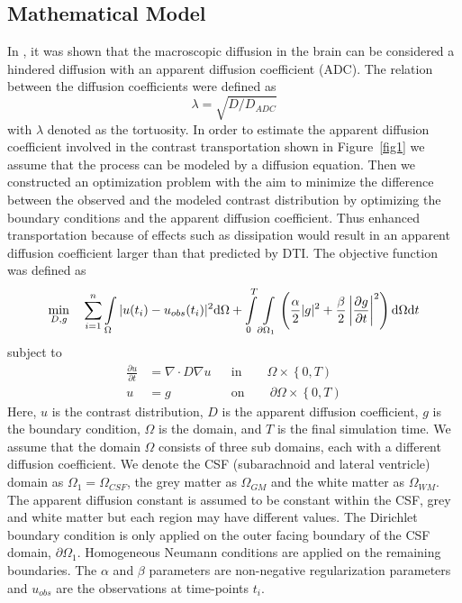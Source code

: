 \documentclass[12pt,a4paper]{article}
\begin{document}
\subsection{Mathematical Model}
In \citet{sykova2008diffusion}, it was shown that the macroscopic diffusion in the brain can be considered a hindered diffusion with an apparent diffusion coefficient (ADC). The relation between the diffusion coefficients were defined as 
\begin{equation}
 \lambda =  \sqrt {D/D_{ADC}}
\label{tortuosity}
\end{equation}
with $\lambda$ denoted as the tortuosity.
In order to estimate the apparent diffusion coefficient involved in the contrast transportation shown in Figure~\ref{fig1} we assume that the process can be modeled by a diffusion equation. 
Then we constructed an optimization problem with the aim to minimize the difference between the observed and the modeled contrast distribution by optimizing the boundary conditions and the apparent diffusion coefficient. Thus enhanced transportation because of effects such as dissipation would result in an apparent diffusion coefficient larger than that predicted by DTI. The objective function was defined as 
\begin{equation}
\min_{D,g} \quad \sum\limits_{i=1}\sp{n} \int\limits_{\Omega} |u(t_i) - u_{obs}(t_i)|\sp{2} \mathrm{d}\Omega + \int\limits_{0}\sp{T} \int\limits_{\partial \Omega_1} \left( \frac{\alpha}{2} | g |\sp{2} + \frac{\beta}{2} \left| \frac{\partial g}{\partial t} \right|\sp{2} \right) \mathrm{d}\Omega \mathrm{d}t  
\label{EQ::objf}
\end{equation}
subject to   
\begin{equation}
\begin{aligned}
\frac{\partial u}{\partial t} &= \nabla \cdot  D \nabla u && \text{in} \qquad \Omega \times \left\lbrace 0 , T \right)  \\
u&=g && \text{on} \qquad \partial\Omega  \times \left\lbrace 0 , T \right) 
\end{aligned}
\label{Eq::PDE}
\end{equation}
Here, $u$ is the contrast distribution, $D$ is the apparent diffusion 
coefficient, $g$ is the boundary condition, $\Omega$ is the domain, and $T$ is the final simulation time. We assume that the domain $\Omega$ consists of three sub domains, each with a different diffusion coefficient. We denote the CSF (subarachnoid and lateral ventricle) domain as $\Omega_1=\Omega_{CSF}$, the grey matter as $\Omega_{GM}$ and the white matter as $\Omega_{WM}$. 
The apparent
diffusion constant is assumed to be constant within the CSF, grey and 
white matter but each region may have different values.  
The Dirichlet boundary condition is only applied on the outer facing boundary of the CSF domain, $\partial \Omega_1$. Homogeneous Neumann conditions are applied on the remaining boundaries.
The $\alpha$ and $\beta$ parameters are non-negative regularization parameters 
and $u_{obs}$ are the observations at time-points $t_i$. 
\end{document}
